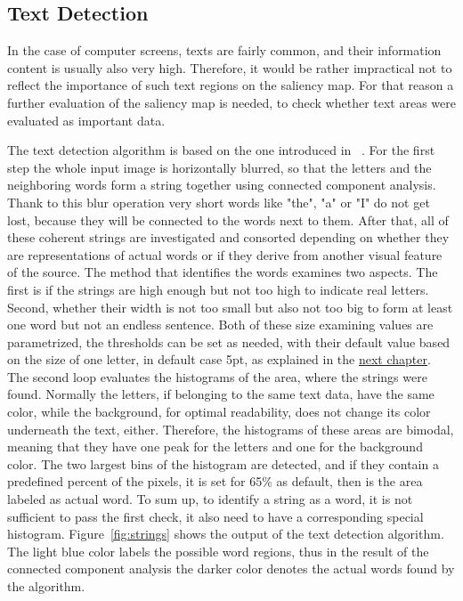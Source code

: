 \documentclass[draft,final]{vutinfth} %
\begin{document}
	\subsection{Text Detection}
	In the case of computer screens, texts are fairly common, and their information content is usually also very high.
	Therefore, it would be rather impractical not to reflect the importance of such text regions on the saliency map. 
	For that reason a further evaluation of the saliency map is needed, to check whether text areas were evaluated as important data.\par 
	The text detection algorithm is based on the one introduced in ~\cite{chang2011associating}.
	For the first step the whole input image is horizontally blurred, so that the letters and the neighboring words form a string together using connected component analysis.
	Thank to this blur operation very short words like "the", "a" or "I" do not get lost, because they will be connected to the words next to them.
	After that, all of these coherent strings are investigated and consorted depending on whether they are representations of actual words or if they derive from another visual feature of the source.
	The method that identifies the words examines two aspects.
	The first is if the strings are high enough but not too high to indicate real letters.
	Second, whether their width is not too small but also not too big to form at least one word but not an endless sentence.
	Both of these size examining values are parametrized, the thresholds can be set as needed, with their default value based on the size of one letter, in default case 5pt, as explained in the \hyperref[Implementation]{next chapter}. 
	The second loop evaluates the histograms of the area, where the strings were found.
	Normally the letters, if belonging to the same text data, have the same color, while the background, for optimal readability, does not change its color underneath the text, either.
	Therefore, the histograms of these areas are bimodal, meaning that they have one peak for the letters and one for the background color. 
	The two largest bins of the histogram are detected, and if they contain a predefined percent of the pixels, it is set for 65\% as default, then is the area labeled as actual word.
	To sum up, to identify a string as a word, it is not sufficient to pass the first check, it  also need  to have a corresponding special histogram. 
	Figure~\ref{fig:strings} shows the output of the text detection algorithm. 
	The light blue color labels the possible word regions, thus in the result of the connected component analysis the darker color denotes the actual words found by the algorithm.\par 
\end{document}
